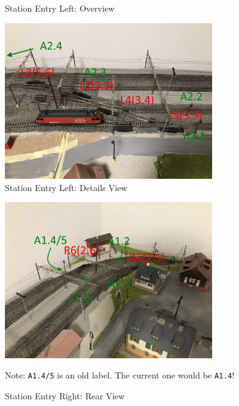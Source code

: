 \documentclass{scrreprt}
\newcommand{\code}[1]{\texttt{#1}}
\begin{document}
\begin{appendices}
\begin{figure}[h!]
	\caption{Station Entry Left: Overview}
\end{figure}
\begin{figure}[h!]
	\centering
	\includegraphics[width=0.8\textwidth]{ref/left details}
	\caption{Station Entry Left: Details View}
\end{figure}
\begin{figure}[h!]
	\centering
	\includegraphics[width=0.8\textwidth]{ref/right rear}
	\caption{Station Entry Right: Rear View}
	Note: \code{A1.4/5} is an old label. The current one would be \code{A1.4}!
\end{figure}
\begin{figure}[h!]
	\centering

\end{figure}
\end{appendices}
\end{document}
